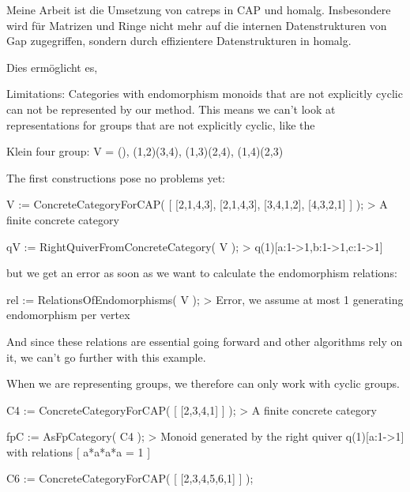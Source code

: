 \documentclass{beamer}
\begin{document}
Meine Arbeit ist die Umsetzung von catreps in CAP und homalg. Insbesondere wird für
Matrizen und Ringe nicht mehr auf die internen Datenstrukturen von Gap zugegriffen, sondern
durch effizientere Datenstrukturen in homalg.

Dies ermöglicht es, 





Limitations: Categories with endomorphism monoids that are not explicitly cyclic
can not be represented by our method. This means we can't look at representations
for groups that are not explicitly cyclic, like the

Klein four group: V = {(), (1,2)(3,4), (1,3)(2,4), (1,4)(2,3) }

The first constructions pose no problems yet:

V := ConcreteCategoryForCAP( [ [2,1,4,3], [2,1,4,3], [3,4,1,2], [4,3,2,1] ] );
> A finite concrete category

qV := RightQuiverFromConcreteCategory( V );
> q(1)[a:1->1,b:1->1,c:1->1]

but we get an error as soon as we want to calculate the endomorphism relations:

rel := RelationsOfEndomorphisms( V );
> Error, we assume at most 1 generating endomorphism per vertex

And since these relations are essential going forward and other algorithms rely on it,
we can't go further with this example.

When we are representing groups, we therefore can only work with cyclic groups.

C4 := ConcreteCategoryForCAP( [ [2,3,4,1] ] );
> A finite concrete category

fpC := AsFpCategory( C4 );
> Monoid generated by the right quiver q(1)[a:1->1] with relations [ a*a*a*a = 1 ]


C6 := ConcreteCategoryForCAP( [ [2,3,4,5,6,1] ] );
\end{document}
